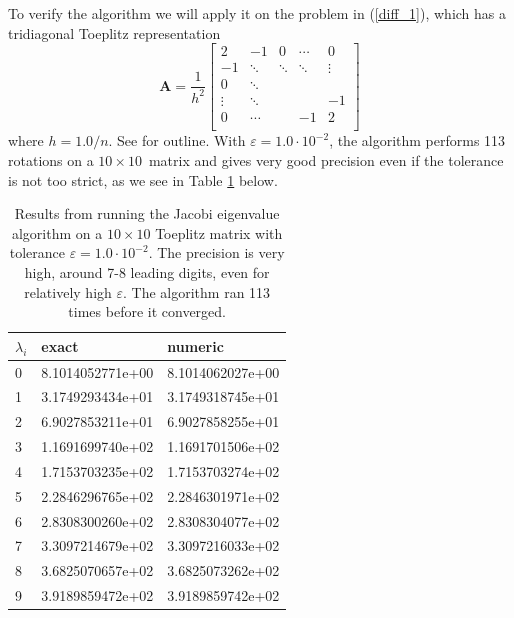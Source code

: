 \documentclass[]{article}
\begin{document}
To verify the algorithm we will apply it on the problem in (\ref{diff_1}), which has a tridiagonal Toeplitz representation 
\begin{equation}
\label{toeplitz_matrix}
\mathbf{A} = 
\frac{1}{h^2}
\begin{bmatrix}
2		& -1			& 0				& \cdots 	& 0 \\
-1		& \ddots		& \ddots		& \ddots 	& \vdots \\
0		& \ddots		& 				& 		 	& \\
\vdots	& \ddots		& 				& 		 	& -1 \\
0		& \cdots		& 				& -1 		& 2 \\

\end{bmatrix}
\end{equation}
where $h = 1.0/n$. See \cite{fys4150-p2} for outline. With $\varepsilon = 1.0 \cdot 10^{-2}$, the algorithm performs 113 rotations on a $10 \times 10$ matrix and gives very good precision even if the tolerance is not too strict, as we see in Table \ref{tab:toeplitz_methods} below.
\begin{table}[ht]
	\caption{Results from running the Jacobi eigenvalue algorithm on a $10 \times 10$ Toeplitz matrix with tolerance $\varepsilon = 1.0 \cdot 10^{-2}$. The precision is very high, around 7-8 leading digits, even for relatively high $\varepsilon$. The algorithm ran 113 times before it converged.}
	\label{tab:toeplitz_methods}
	\begin{center}
		\begin{tabular}{lll}
			\toprule
			$\lambda_i$ &              exact &            numeric \\
			\midrule
				0 & 8.1014052771e+00 & 8.1014062027e+00 \\
				1 & 3.1749293434e+01 & 3.1749318745e+01 \\
				2 & 6.9027853211e+01 & 6.9027858255e+01 \\
				3 & 1.1691699740e+02 & 1.1691701506e+02 \\
				4 & 1.7153703235e+02 & 1.7153703274e+02 \\
				5 & 2.2846296765e+02 & 2.2846301971e+02 \\
				6 & 2.8308300260e+02 & 2.8308304077e+02 \\
				7 & 3.3097214679e+02 & 3.3097216033e+02 \\
				8 & 3.6825070657e+02 & 3.6825073262e+02 \\
				9 & 3.9189859472e+02 & 3.9189859742e+02 \\
			\bottomrule
		\end{tabular}
	\end{center}
\end{table}
\end{document}
